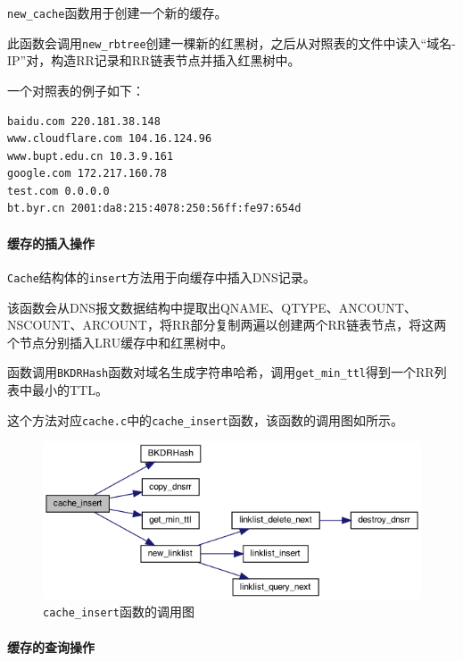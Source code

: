 \documentclass[lang=cn,11pt,a4paper,cite=authornum]{paper}
\begin{document}
\texttt{new_cache}函数用于创建一个新的缓存。

此函数会调用\texttt{new_rbtree}创建一棵新的红黑树，之后从对照表的文件中读入“域名-IP”对，构造RR记录和RR链表节点并插入红黑树中。

一个对照表的例子如下：

\begin{code}
\begin{verbatim}
baidu.com 220.181.38.148
www.cloudflare.com 104.16.124.96
www.bupt.edu.cn 10.3.9.161
google.com 172.217.160.78
test.com 0.0.0.0
bt.byr.cn 2001:da8:215:4078:250:56ff:fe97:654d
\end{verbatim}
\end{code}

\paragraph{缓存的插入操作} 

\texttt{Cache}结构体的\texttt{insert}方法用于向缓存中插入DNS记录。

该函数会从DNS报文数据结构中提取出QNAME、QTYPE、ANCOUNT、NSCOUNT、ARCOUNT，将RR部分复制两遍以创建两个RR链表节点，将这两个节点分别插入LRU缓存中和红黑树中。

函数调用\texttt{BKDRHash}函数对域名生成字符串哈希，调用\texttt{get_min_ttl}得到一个RR列表中最小的TTL。

这个方法对应\texttt{cache.c}中的\texttt{cache_insert}函数，该函数的调用图如所示。

\begin{figure}[htbp]

    \centering
    \includegraphics[width=0.8\linewidth]{./APIdoc/cache_8c_a6ced4e1f620d2e750fb0c2c049962fa8_cgraph.png}
    \caption{\texttt{cache_insert}函数的调用图\label{fig:cache_insert_call}}

\end{figure}

\paragraph{缓存的查询操作}
\end{document}
